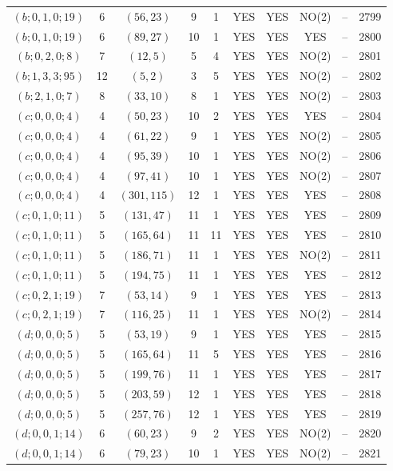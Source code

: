 \begin{longtable}{|c|c|c|c|c|c|c|c|c|c|}
$(b; 0, 1, 0; 19)$ & 6 & $(56, 23)$ & 9 & 1 & YES & YES & NO(2) & -- & 2799\\
$(b; 0, 1, 0; 19)$ & 6 & $(89, 27)$ & 10 & 1 & YES & YES & YES & -- & 2800\\
$(b; 0, 2, 0; 8)$ & 7 & $(12, 5)$ & 5 & 4 & YES & YES & NO(2) & -- & 2801\\
$(b; 1, 3, 3; 95)$ & 12 & $(5, 2)$ & 3 & 5 & YES & YES & NO(2) & -- & 2802\\
$(b; 2, 1, 0; 7)$ & 8 & $(33, 10)$ & 8 & 1 & YES & YES & NO(2) & -- & 2803\\
$(c; 0, 0, 0; 4)$ & 4 & $(50, 23)$ & 10 & 2 & YES & YES & YES & -- & 2804\\
$(c; 0, 0, 0; 4)$ & 4 & $(61, 22)$ & 9 & 1 & YES & YES & NO(2) & -- & 2805\\
$(c; 0, 0, 0; 4)$ & 4 & $(95, 39)$ & 10 & 1 & YES & YES & NO(2) & -- & 2806\\
$(c; 0, 0, 0; 4)$ & 4 & $(97, 41)$ & 10 & 1 & YES & YES & NO(2) & -- & 2807\\
$(c; 0, 0, 0; 4)$ & 4 & $(301, 115)$ & 12 & 1 & YES & YES & YES & -- & 2808\\
$(c; 0, 1, 0; 11)$ & 5 & $(131, 47)$ & 11 & 1 & YES & YES & YES & -- & 2809\\
$(c; 0, 1, 0; 11)$ & 5 & $(165, 64)$ & 11 & 11 & YES & YES & YES & -- & 2810\\
$(c; 0, 1, 0; 11)$ & 5 & $(186, 71)$ & 11 & 1 & YES & YES & NO(2) & -- & 2811\\
$(c; 0, 1, 0; 11)$ & 5 & $(194, 75)$ & 11 & 1 & YES & YES & YES & -- & 2812\\
$(c; 0, 2, 1; 19)$ & 7 & $(53, 14)$ & 9 & 1 & YES & YES & YES & -- & 2813\\
$(c; 0, 2, 1; 19)$ & 7 & $(116, 25)$ & 11 & 1 & YES & YES & NO(2) & -- & 2814\\
$(d; 0, 0, 0; 5)$ & 5 & $(53, 19)$ & 9 & 1 & YES & YES & YES & -- & 2815\\
$(d; 0, 0, 0; 5)$ & 5 & $(165, 64)$ & 11 & 5 & YES & YES & YES & -- & 2816\\
$(d; 0, 0, 0; 5)$ & 5 & $(199, 76)$ & 11 & 1 & YES & YES & YES & -- & 2817\\
$(d; 0, 0, 0; 5)$ & 5 & $(203, 59)$ & 12 & 1 & YES & YES & YES & -- & 2818\\
$(d; 0, 0, 0; 5)$ & 5 & $(257, 76)$ & 12 & 1 & YES & YES & YES & -- & 2819\\
$(d; 0, 0, 1; 14)$ & 6 & $(60, 23)$ & 9 & 2 & YES & YES & NO(2) & -- & 2820\\
$(d; 0, 0, 1; 14)$ & 6 & $(79, 23)$ & 10 & 1 & YES & YES & NO(2) & -- & 2821\\

\end{longtable}
